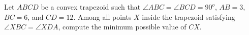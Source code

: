 Let $ABCD$ be a convex trapezoid such that $\angle ABC = \angle BCD = 90^o$, $AB = 3$, $BC = 6$, and $CD = 12$. Among all points $X$ inside the trapezoid satisfying $\angle XBC = \angle XDA$, compute the minimum possible value of $CX$.
